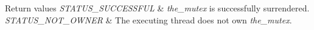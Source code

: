 \begin{DoxyRetVals}{Return values}
{\em S\+T\+A\+T\+U\+S\+\_\+\+S\+U\+C\+C\+E\+S\+S\+F\+UL} & {\itshape the\+\_\+mutex} is successfully surrendered. \\
\hline
{\em S\+T\+A\+T\+U\+S\+\_\+\+N\+O\+T\+\_\+\+O\+W\+N\+ER} & The executing thread does not own {\itshape the\+\_\+mutex}. \\
\hline
\end{DoxyRetVals}
